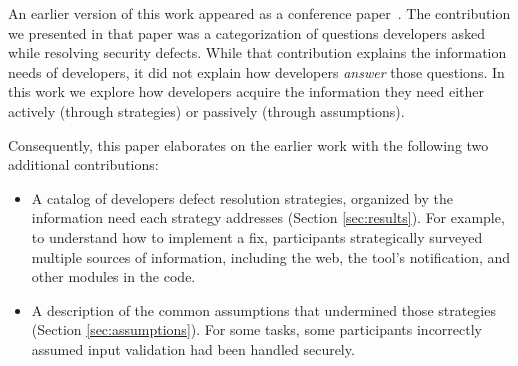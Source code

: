\documentclass[10pt,journal,compsoc]{IEEEtran}
\begin{document}
%
%
%
%

An earlier version of this work appeared as a conference paper~\cite{Smith2015Questions}. 
The contribution we presented in that paper was a categorization of questions developers asked while resolving security defects.
While that contribution explains the information needs of developers, it did not explain how developers \textit{answer} those questions.
In this work we explore how developers acquire the information they need either actively (through strategies) or passively (through assumptions).


Consequently, this paper elaborates on the earlier work with the following two additional contributions:

\begin{itemize}
	\item A catalog of developers defect resolution strategies, organized by the information need each strategy addresses (Section \ref{sec:results}). 
	For example, to understand how to implement a fix, participants strategically surveyed multiple sources of information, including the web, the tool's notification, and other modules in the code.
	\item A description of the common assumptions that undermined those strategies (Section \ref{sec:assumptions}). 
	For some tasks, some participants incorrectly assumed input validation had been handled securely.
\end{itemize}
\end{document}
